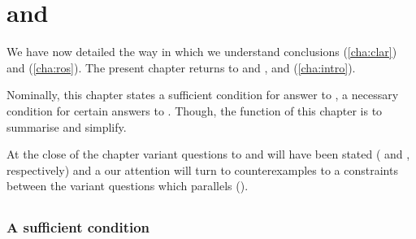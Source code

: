 \chapter{\qWhyV{} and \qHowV{}}
\label{cha:var}


\begin{note}
  We have now detailed the way in which we understand conclusions (\autoref{cha:clar}) and \ros{} (\autoref{cha:ros}).
  The present chapter returns to \qWhy{} and \qHow{}, and \issueInclusion{} (\autoref{cha:intro}).

  Nominally, this chapter states a sufficient condition for answer to \qWhy{}, a necessary condition for certain answers to \qHow{}.
  Though, the function of this chapter is to summarise and simplify.

  At the close of the chapter variant questions to \qWhy{} and \qHow{} will have been stated (\qWhyV{} and \qHowV{}, respectively) and a our attention will turn to counterexamples to a constraints between the variant questions which parallels \issueInclusion{} (\issueConstraint{}).
\end{note}

\section{\qWhyV{}}
\label{cha:var:qwhyvnp}


\subsection{A sufficient condition}
\label{sec:sufficient-condition}

